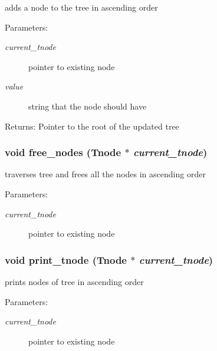 adds a node to the tree in ascending order \begin{Desc}
\item[Parameters:]
\begin{description}
\item[{\em current\_\-tnode}]pointer to existing node \item[{\em value}]string that the node should have \end{description}
\end{Desc}
\begin{Desc}
\item[Returns:]Pointer to the root of the updated tree \end{Desc}
\subsubsection{\setlength{\rightskip}{0pt plus 5cm}void free\_\-nodes (\bf{Tnode} $\ast$ {\em current\_\-tnode})}\label{tree_8c_5ff3cf4a1ae4638168f0c003f04cc718}


traverses tree and frees all the nodes in ascending order \begin{Desc}
\item[Parameters:]
\begin{description}
\item[{\em current\_\-tnode}]pointer to existing node \end{description}
\end{Desc}
\subsubsection{\setlength{\rightskip}{0pt plus 5cm}void print\_\-tnode (\bf{Tnode} $\ast$ {\em current\_\-tnode})}\label{tree_8c_a29be39c138fe7565f6b20455b8ba6ac}


prints nodes of tree in ascending order \begin{Desc}
\item[Parameters:]
\begin{description}
\item[{\em current\_\-tnode}]pointer to existing node \end{description}
\end{Desc}
